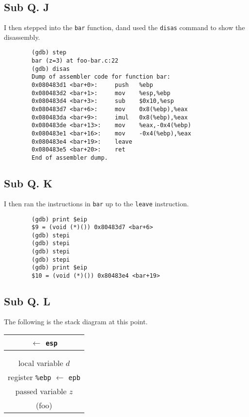 \documentclass[letterpaper, 10pt]{article}
\begin{document}
	\subsection*{Sub Q. J}

	I then stepped into the {\tt bar} function, dand used the {\tt disas} command to show the disassembly.

	\begin{verbatim}
		(gdb) step
		bar (z=3) at foo-bar.c:22
		(gdb) disas
		Dump of assembler code for function bar:
		0x080483d1 <bar+0>:     push   %ebp
		0x080483d2 <bar+1>:     mov    %esp,%ebp
		0x080483d4 <bar+3>:     sub    $0x10,%esp
		0x080483d7 <bar+6>:     mov    0x8(%ebp),%eax
		0x080483da <bar+9>:     imul   0x8(%ebp),%eax
		0x080483de <bar+13>:    mov    %eax,-0x4(%ebp)
		0x080483e1 <bar+16>:    mov    -0x4(%ebp),%eax
		0x080483e4 <bar+19>:    leave
		0x080483e5 <bar+20>:    ret
		End of assembler dump.
	\end{verbatim}

	\subsection*{Sub Q. K}

	I then ran the instructions in {\tt bar} up to the {\tt leave} instruction.

	\begin{verbatim}
		(gdb) print $eip
		$9 = (void (*)()) 0x80483d7 <bar+6>
		(gdb) stepi
		(gdb) stepi
		(gdb) stepi
		(gdb) stepi
		(gdb) print $eip
		$10 = (void (*)()) 0x80483e4 <bar+19>
	\end{verbatim}

	\subsection*{Sub Q. L}

	The following is the stack diagram at this point.

	\vspace{1em}
	\begin{tabular} { | c | }
		$\longleftarrow$ {\tt esp} \\ \hline
		\\ \hline
		\\ \hline
		local variable $d$ \\ \hline
		register {\tt \%ebp} $\longleftarrow$ {\tt epb} \\ \hline
		passed variable $z$ \\
		\hline \hline
		(foo) \\
	\end{tabular}
\end{document}
